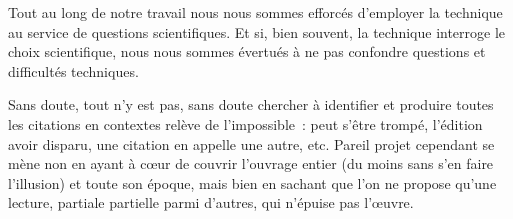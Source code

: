 \documentclass[12pt, a4paper]{article}
\begin{document}
Tout au long de notre travail nous nous sommes efforcés d'employer la technique au service de questions scientifiques. Et si, bien souvent, la technique interroge le choix scientifique, nous nous sommes évertués à ne pas confondre questions et difficultés techniques. 

Sans doute, tout n'y est pas, sans doute chercher à identifier et produire toutes les citations en contextes relève de l'impossible~: \robbe{} peut s'être trompé, l'édition avoir disparu, une citation en appelle une autre, etc. Pareil projet cependant se mène non en ayant à cœur de couvrir l'ouvrage entier (du moins sans s'en faire l'illusion) et toute son époque, mais bien en sachant que l'on ne propose qu'une lecture, partiale partielle parmi d'autres,  qui n'épuise pas l'œuvre.
\end{document}

